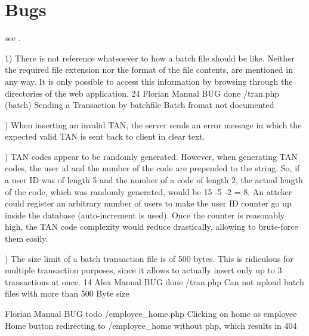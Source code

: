 \chapter{Bugs}\label{chapter:bugs}

see .

1) There is not reference whatsoever to how a batch file should be like. Neither the required file extension nor the format of the file contents, are mentioned in any way. It is only possible to access this information by browsing through the directories of the web application.
24	Florian	Manual	BUG	done	/tran.php (batch)	Sending a Transaction by batchfile	Batch fromat not documented																					

\hrulefill {}) When inserting an invalid TAN, the server sends an error message in which the expected valid TAN is sent back to client in clear text.

\hrulefill {}) TAN codes appear to be randomly generated. However, when generating TAN codes, the user id and the number of the code are prepended to the string. So, if a user ID was of length 5 and the number of a code of length 2, the actual length of the code, which was randomly generated, would be 15 -5 -2 = 8. An attcker could register an arbitrary number of users to make the user ID counter go up inside the database (auto-increment is used). Once the counter is reasonably high, the TAN code complexity would reduce drastically, allowing to brute-force them easily.

\hrulefill {}) The size limit of a batch transaction file is of 500 bytes. This is ridiculous for multiple transaction purposes, since it allows to actually insert only up to 3 transactions at once.
14	Alex	Manual	BUG	done	/tran.php	Can not upload batch files with more than 500 Byte size		

\hrulefill {}	Florian	Manual	BUG	todo	/employee\_home.php	Clicking on home as employee	Home button redirecting to /employee\_home without php, which results in 404																					
